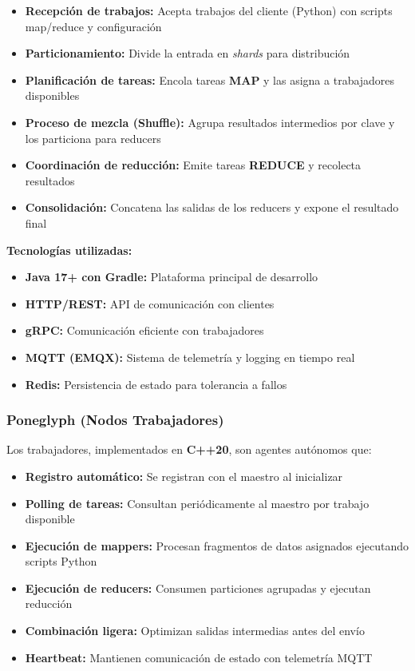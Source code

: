 \begin{itemize}
    \item \textbf{Recepción de trabajos:} Acepta trabajos del cliente (Python) con scripts map/reduce y configuración
    \item \textbf{Particionamiento:} Divide la entrada en \emph{shards} para distribución
    \item \textbf{Planificación de tareas:} Encola tareas \textbf{MAP} y las asigna a trabajadores disponibles
    \item \textbf{Proceso de mezcla (Shuffle):} Agrupa resultados intermedios por clave y los particiona para reducers
    \item \textbf{Coordinación de reducción:} Emite tareas \textbf{REDUCE} y recolecta resultados
    \item \textbf{Consolidación:} Concatena las salidas de los reducers y expone el resultado final
\end{itemize}

\textbf{Tecnologías utilizadas:}
\begin{itemize}
    \item \textbf{Java 17+ con Gradle:} Plataforma principal de desarrollo
    \item \textbf{HTTP/REST:} API de comunicación con clientes
    \item \textbf{gRPC:} Comunicación eficiente con trabajadores
    \item \textbf{MQTT (EMQX):} Sistema de telemetría y logging en tiempo real
    \item \textbf{Redis:} Persistencia de estado para tolerancia a fallos
\end{itemize}

\subsubsection{Poneglyph (Nodos Trabajadores)}

Los trabajadores, implementados en \textbf{C++20}, son agentes autónomos que:

\begin{itemize}
    \item \textbf{Registro automático:} Se registran con el maestro al inicializar
    \item \textbf{Polling de tareas:} Consultan periódicamente al maestro por trabajo disponible
    \item \textbf{Ejecución de mappers:} Procesan fragmentos de datos asignados ejecutando scripts Python
    \item \textbf{Ejecución de reducers:} Consumen particiones agrupadas y ejecutan reducción
    \item \textbf{Combinación ligera:} Optimizan salidas intermedias antes del envío
    \item \textbf{Heartbeat:} Mantienen comunicación de estado con telemetría MQTT
\end{itemize}

